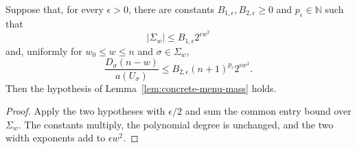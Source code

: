 \begin{lemma}
\label{lem:index-entry-menu-mass}
Suppose that, for every $\epsilon>0$, there are constants
$B_{1,\epsilon},B_{2,\epsilon}\geq0$ and
$p_\epsilon\in\mathbb N$ such that
\[
 |\Sigma_w|\leq B_{1,\epsilon}2^{\epsilon w^2}
\]
and, uniformly for $w_0\leq w\leq n$ and $\sigma\in\Sigma_w$,
\[
 \frac{D_\sigma(n-w)}{a(U_\sigma)}
 \leq B_{2,\epsilon}(n+1)^{p_\epsilon}2^{\epsilon w^2}.
\]
Then the hypothesis of Lemma~\ref{lem:concrete-menu-mass} holds.
\end{lemma}
\begin{proof}
Apply the two hypotheses with $\epsilon/2$ and sum the common entry bound
over $\Sigma_w$.  The constants multiply, the polynomial degree is unchanged,
and the two width exponents add to $\epsilon w^2$.
\end{proof}

